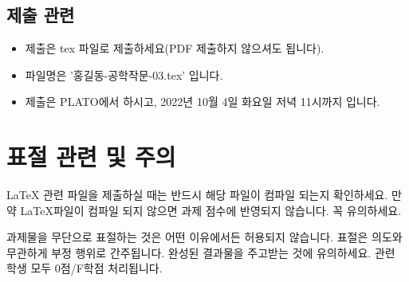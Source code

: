 \documentclass[11pt, a4paper]{article}
\begin{document}
\subsection{제출 관련}
\begin{itemize}
    \item 제출은 tex 파일로 제출하세요(PDF 제출하지 않으셔도 됩니다).
    \item 파일명은 '홍길동-공학작문-03.tex' 입니다.
    \item 제출은 PLATO에서 하시고, 2022년 10월 4일 화요일 저녁 11시까지 입니다.
\end{itemize}

\section{표절 관련 및 주의}
\LaTeX{} 관련 파일을 제출하실 때는 반드시 해당 파일이 컴파일 되는지 확인하세요. 만약 \LaTeX 파일이 컴파일 되지 않으면 과제 점수에 반영되지 않습니다. 꼭 유의하세요. 

과제물을 무단으로 표절하는 것은 어떤 이유에서든 허용되지 않습니다. 표절은 의도와 무관하게 부정 행위로 간주됩니다. 완성된 결과물을 주고받는 것에 유의하세요. 관련 학생 모두 0점/F학점 처리됩니다.
\end{document}
